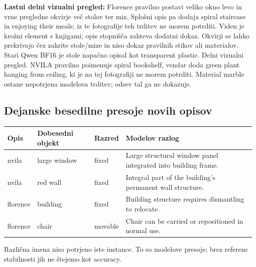 \documentclass[10pt,a4paper]{article}
\begin{document}
\textbf{Lastni delni vizualni pregled:} Florence pravilno postavi veliko okno levo in vrne pregledne okvirje več stolov ter miz. Splošni opis pa dodaja spiral staircase in enjoying their meals; iz te fotografije teh trditev ne morem potrditi. Viden je krožni element s knjigami; opis stopnišča zahteva dodatni dokaz. Okvirji se lahko prekrivajo čez zakrite stole/mize in niso dokaz pravilnih stikov ali materialov. Stari Qwen BF16 je stole napačno opisal kot transparent plastic. Delni vizualni pregled. NVILA pravilno poimenuje spiral bookshelf, vendar doda green plant hanging from ceiling, ki je na tej fotografiji ne morem potrditi. Material marble ostane nepotrjena modelova trditev; odsev tal ga ne dokazuje.
\subsection*{Dejanske besedilne presoje novih opisov}\begin{center}\small\begin{tabular}{p{1.6cm}p{4.2cm}p{1.8cm}p{7.6cm}}\toprule
Opis & Dobesedni objekt & Razred & Modelov razlog \\ \midrule
nvila & large window & fixed & Large structural window panel integrated into building frame. \\
nvila & red wall & fixed & Integral part of the building's permanent wall structure. \\
florence & building & fixed & Building structure requires dismantling to relocate. \\
florence & chair & movable & Chair can be carried or repositioned in normal use. \\
\bottomrule\end{tabular}\end{center}
Različna imena niso potrjeno iste instance. To so modelove presoje; brez referenc stabilnosti jih ne štejemo kot accuracy.

\newpage
\end{document}
